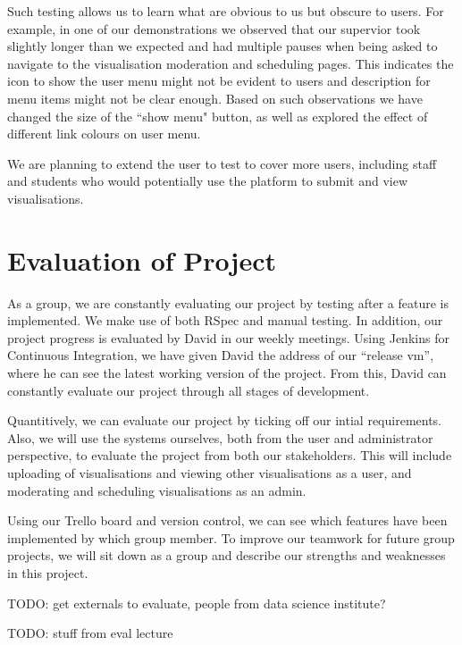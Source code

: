 \documentclass[a4paper]{article}
\begin{document}
Such testing allows us to learn what are obvious to us but obscure to users.
For example, in one of our demonstrations we observed that our supervior 
took slightly longer than we expected and had multiple pauses when
being asked to navigate to the visualisation moderation and scheduling pages. This 
indicates the icon to show the user menu might not be evident to users and
description for menu items might not be clear enough. Based on such observations
we have changed the size of the ``show menu" button, as well as explored the effect
of different link colours on user menu.

We are planning to extend the user to test to cover more users, including staff
and students who would potentially use the platform to submit and view visualisations.

\section{Evaluation of Project}
As a group, we are constantly evaluating our project by testing after a 
feature is implemented. We make use of both RSpec and manual testing. In 
addition, our project progress is evaluated by David in our weekly 
meetings. Using Jenkins for Continuous Integration, we have given David
the address of our ``release vm'', where he can see the latest working 
version of the project. From this, David can constantly evaluate our project 
through all stages of development.

Quantitively, we can evaluate our project by ticking off our intial 
requirements. Also, we will use the systems ourselves, both from the user 
and administrator perspective, to evaluate the project from both our stakeholders.
This will include uploading of visualisations and viewing other visualisations as a
user, and moderating and scheduling visualisations as an admin.

Using our Trello board and version control, we can see which features have been 
implemented by which group member. To improve our teamwork for future group 
projects, we will sit down as a group and describe our strengths and weaknesses in 
this project.

TODO: get externals to evaluate, people from data science institute? 

TODO: stuff from eval lecture
\end{document}
